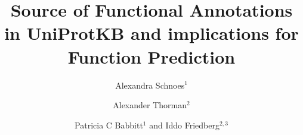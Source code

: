 \documentclass[10pt]{bmc_article}
\newenvironment{bmcformat}{\begin{raggedright}\baselineskip20pt\sloppy\setboolean{publ}{false}}{\end{raggedright}\baselineskip20pt\sloppy}
\begin{document}
\begin{bmcformat}



\title{Source of Functional Annotations in UniProtKB and implications for
Function Prediction}
 


\author{Alexandra Schnoes$^1$%
      \and
         Alexander Thorman$^2$%
       \and 
         Patricia C Babbitt$^1$%
        and
         Iddo Friedberg\correspondingauthor$^{2,3}$%
      }
      


\address{%
    \iid(1)UCSF,%
        San Francisco, CA, USA\\
    \iid(2)Department of Microbiology, Miami University, Oxford, OH USA\\
    \iid(3)Department of Computer Science and Software Engineering , Miami University, Oxford, OH USA
}%

\maketitle




\end{bmcformat}
\end{document}
